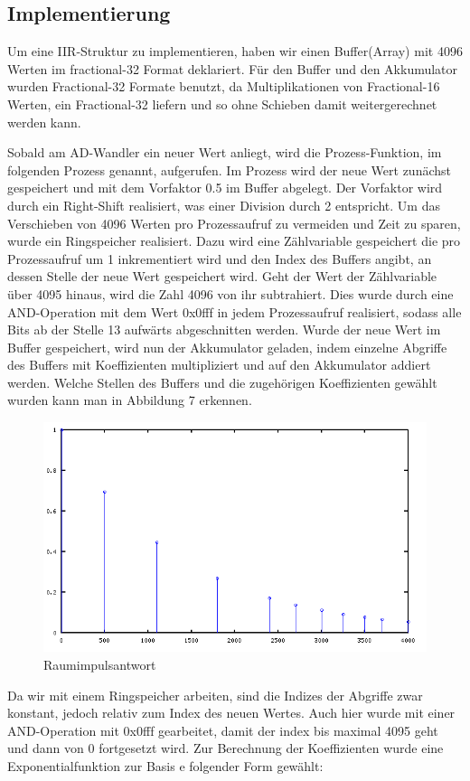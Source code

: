 \documentclass[a4paper,12pt,fontsize=12,DIV=12]{scrartcl}
\begin{document}
\subsection{Implementierung}
Um eine IIR-Struktur zu implementieren, haben wir einen Buffer(Array) mit 4096 Werten im fractional-32 Format deklariert. Für den Buffer und den Akkumulator wurden Fractional-32 Formate benutzt, da Multiplikationen von Fractional-16 Werten, ein Fractional-32 liefern und so ohne Schieben damit weitergerechnet werden kann.

Sobald am AD-Wandler ein neuer Wert anliegt, wird die Prozess-Funktion, im folgenden Prozess genannt, aufgerufen. Im Prozess wird der neue Wert zunächst gespeichert und mit dem Vorfaktor 0.5 im Buffer abgelegt. Der Vorfaktor wird durch ein Right-Shift realisiert, was einer Division durch 2 entspricht. 
Um das Verschieben von 4096 Werten pro Prozessaufruf zu vermeiden und Zeit zu sparen, wurde ein Ringspeicher realisiert. Dazu wird eine Zählvariable gespeichert die pro Prozessaufruf um 1 inkrementiert wird und den Index des Buffers angibt, an dessen Stelle der neue Wert gespeichert wird. Geht der Wert der Zählvariable über 4095 hinaus, wird die Zahl 4096 von ihr subtrahiert. Dies wurde durch eine AND-Operation mit dem Wert 0x0fff in jedem Prozessaufruf realisiert, sodass alle Bits ab der Stelle 13  aufwärts abgeschnitten werden.
Wurde der neue Wert im Buffer gespeichert, wird nun der Akkumulator geladen, indem einzelne Abgriffe des Buffers mit Koeffizienten multipliziert und auf den Akkumulator addiert werden. Welche Stellen des Buffers und die zugehörigen Koeffizienten gewählt wurden kann man in Abbildung 7 erkennen.
\begin{figure}[h]
	\includegraphics[scale=0.5]{Bilder/signalabgriffe.png}
	\caption{Raumimpulsantwort}
	\label{labelname}
\end{figure}
Da wir mit einem Ringspeicher arbeiten, sind die Indizes der Abgriffe zwar konstant, jedoch relativ zum Index des neuen Wertes. Auch hier wurde mit einer AND-Operation mit 0x0fff gearbeitet, damit der index bis maximal 4095 geht und dann von 0 fortgesetzt wird.
Zur Berechnung der Koeffizienten wurde eine Exponentialfunktion zur Basis e folgender Form gewählt:
\end{document}
